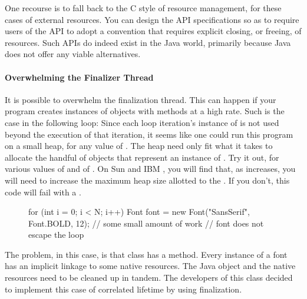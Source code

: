 
One recourse is to fall back to the C style of resource management, for these
cases of external resources. You can design the API specifications so as to
require users of the API to adopt a convention that requires explicit closing,
or freeing, of resources. Such APIs do indeed exist in the Java world, primarily
because Java does not offer any viable alternatives.

\paragraph{Overwhelming the Finalizer Thread}
It is possible to overwhelm the finalization thread. This can happen if your
program creates instances of objects with  methods at a high
rate.
Such is the case in the following loop:
Since each loop iteration's instance of  is not used beyond the
execution of that iteration, it seems like one could run this program on a
small heap, for any value of . The heap need only fit what it
takes to allocate the handful of objects that represent an instance of
. Try it out, for various values of  and of
. On Sun and IBM \javasix \jres, you will find that, as 
increases, you will need to increase the maximum heap size allotted to the \jre.
If you don't, this code will fail with a .

\begin{figure}
\centering
\begin{framedlisting}
for (int i = 0; i < N; i++) {
   Font font = new Font("SansSerif", Font.BOLD, 12);
   // some small amount of work
} // font does not escape the loop
\end{framedlisting}
\end{figure}
The problem, in this case, is that  class has a 
method. Every instance of a font has an implicit linkage to some native
resources. The Java object and the native resources need to be cleaned up in
tandem. The developers of this class decided to implement this case of
correlated lifetime by using finalization.

